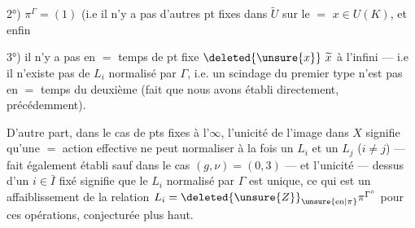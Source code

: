 2°) $\pi^\Gamma=(1)$ (i.e il n'y a pas d'autres
pt fixes dans $\widetilde U$ sur le $=$ $x\in U(K)$,
et enfin

3°) il n'y a pas en $=$ temps de pt
fixe $\deleted{\unsure{x}}\ \widetilde x$ à l'infini --- i.e il n'existe
pas de $L_i$ normalisé par $\Gamma$, i.e. un scindage
du premier type n'est pas en $=$ temps
du deuxième (fait que nous avons
établi directement, précédemment).


D'autre part, dans le cas de pts fixes
à l'$\infty$, l'unicité de l'image dans $X$
signifie qu'une $=$ action effective ne
peut normaliser à la fois un $L_i$ et un $L_j$
($i\ne j$) --- fait également établi sauf
dans le cas $(g,\nu)=(0,3)$ --- et l'unicité
--- dessus d'un $i\in\bar I$ fixé signifie
que le $L_i$  normalisé par $\Gamma$ est unique,
ce qui est un affaiblissement de la
relation $L_i=\deleted{\unsure{Z}}_{\unsure{\mathrm{en}|\pi}}\pi^{\Gamma^\circ}$
pour ces opérations, conjecturée plus haut.

